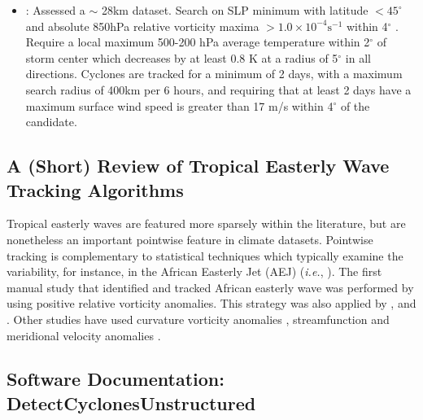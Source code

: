 \documentclass[gmdd, hvmath, online]{copernicus_discussions}
\begin{document}
\begin{itemize}
\item \cite{zarzycki2014multidecadal}:  Assessed a $\sim$ 28km dataset.  Search on SLP minimum with latitude $< 45^\circ$ and absolute 850hPa relative vorticity maxima $> 1.0 \times 10^{-4} \mbox{s}^{-1}$ within 4$^\circ$ .  Require a local maximum 500-200 hPa average temperature within 2$^\circ$ of storm center which decreases by at least 0.8 K at a radius of 5$^\circ$ in all directions.  Cyclones are tracked for a minimum of 2 days, with a maximum search radius of 400km per 6 hours, and requiring that at least 2 days have a maximum surface wind speed is greater than 17 m/s within 4$^\circ$ of the candidate.

\end{itemize}

\subsection{A (Short) Review of Tropical Easterly Wave Tracking Algorithms} \label{sec:TropicalEasterlyWaveAlgorithms}

Tropical easterly waves are featured more sparsely within the literature, but are nonetheless an important pointwise feature in climate datasets.  Pointwise tracking is complementary to statistical techniques which typically examine the variability, for instance, in the African Easterly Jet (AEJ) (\textit{i.e.}, \cite{ceron1999validation}).  The first manual study that identified and tracked African easterly wave was performed by \cite{reed1988evaluation} using positive relative vorticity anomalies.  This strategy was also applied by \cite{thorncroft2001african}, \cite{hodges2003comparison} and \cite{serra2010tracking}.  Other studies have used curvature vorticity anomalies \cite{belanger2014african, bain2014objective}, streamfunction \citep{berry2007african} and meridional velocity anomalies \cite{skinner2014projected}.




\subsection{Software Documentation: DetectCyclonesUnstructured} \label{sec:DetectCyclonesUnstructuredAppendix}
\end{document}
